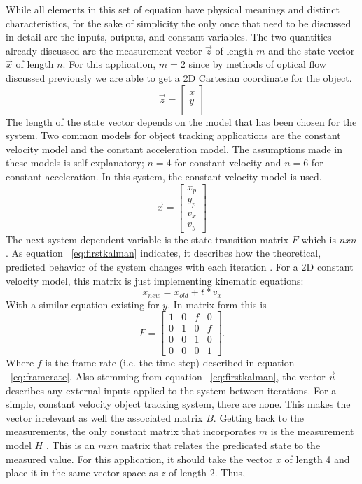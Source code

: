 \documentclass[12pt]{article} %
\begin{document}
While all elements in this set of equation have physical meanings and distinct characteristics, for the sake of simplicity the only once that need to be discussed in detail are the inputs, outputs, and constant variables. The two quantities already discussed are the measurement vector $\vec{z}$ of length $m$ and the state vector $\vec{x}$ of length $n$. For this application, $m = 2$ since by methods of optical flow discussed previously we are able to get a 2D Cartesian coordinate for the object.
\begin{equation}
\vec{z} = \begin{bmatrix}
x \\
y \\
\end{bmatrix}
\end{equation}
The length of the state vector depends on the model that has been chosen for the system. Two common models for object tracking applications are the constant velocity model and the constant acceleration model. The assumptions made in these models is self explanatory; $n=4$ for constant velocity and $n=6$ for constant acceleration. In this system, the constant velocity model is used.
\begin{equation}
 \vec{x} = \begin{bmatrix}
x_p \\
y_p \\
v_x \\
v_y
\end{bmatrix}
\end{equation}
The next system dependent variable is the state transition matrix $F$ which is $nxn$. As equation ~\ref{eq:firstkalman} indicates, it describes how the theoretical, predicted behavior of the system changes with each iteration \cite{12}. For a 2D constant velocity model, this matrix is just implementing kinematic equations:
\begin{equation}
x_{new} = x_{old} + t * v_x
\end{equation}
With a similar equation existing for $y$. In matrix form this is 
\begin{equation}
F= \begin{bmatrix}
1 & 0 & f & 0 \\
0 & 1 & 0 & f \\
0 & 0 & 1 & 0 \\
0 & 0 & 0 & 1
\end{bmatrix}.
\end{equation}
Where $f$ is the frame rate (i.e. the time step) described in equation ~\ref{eq:framerate}. Also stemming from equation ~\ref{eq:firstkalman}, the vector $\vec{u}$ describes any external inputs applied to the system between iterations. For a simple, constant velocity object tracking system, there are none. This makes the vector irrelevant as well the associated matrix $B$. Getting back to the measurements, the only constant matrix that incorporates $m$ is the measurement model $H$ \cite{4}. This is an $mxn$ matrix that relates the predicated state to the measured value. For this application, it should take the vector $x$ of length 4 and place it in the same vector space as $z$ of length 2. Thus,
\end{document}
